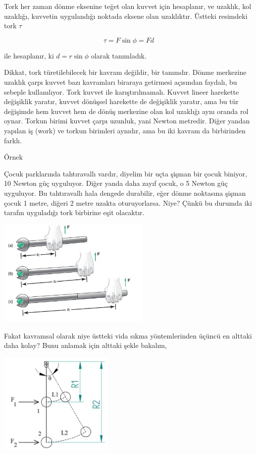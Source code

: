 \documentclass[12pt,fleqn]{article}\usepackage{../../common}
\begin{document}
Tork her zaman dönme eksenine teğet olan kuvvet için hesaplanır, ve
uzaklık, kol uzaklığı, kuvvetin uygulandığı noktada eksene olan
uzaklıktır. Üstteki resimdeki tork $\tau$

$$
\tau = F \sin \phi = F d
$$

ile hesaplanır, ki $d = r \sin\phi$ olarak tanımladık.

Dikkat, tork türetilebilecek bir kavram değildir, bir tanımdır. Dönme merkezine
uzaklık çarpı kuvvet bazı kavramları biraraya getirmesi açısından faydalı, bu
sebeple kullanılıyor. Tork kuvvet ile karıştırılmamalı. Kuvvet lineer harekette
değişiklik yaratır, kuvvet dönüşsel harekette de değişiklik yaratır, ama bu tür
değişimde hem kuvvet hem de dönüş merkezine olan kol uzaklığı aynı oranda rol
oynar. Torkun birimi kuvvet çarpı uzunluk, yani Newton metredir. Diğer yandan
yapılan iş (work) ve torkun birimleri aynıdır, ama bu iki kavram da birbirinden
farklı.


Örnek

Çocuk parklarında tahtıravallı vardır, diyelim bir uçta şişman bir çocuk
biniyor, 10 Newton güç uyguluyor. Diğer yanda daha zayıf çocuk, o 5 Newton
güç uyguluyor. Bu tahtıravallı hala dengede durabilir, eğer dönme noktasına
şişman çocuk 1 metre, diğeri 2 metre uzakta oturuyorlarsa. Niye? Çünkü bu
durumda iki tarafın uyguladığı tork birbirine eşit olacaktır.

\includegraphics[width=20em]{phy_005_basics_02_07.jpg}

Fakat kavramsal olarak niye üstteki vida sıkma yöntemlerinden üçüncü en alttaki
daha kolay? Bunu anlamak için alttaki şekle bakalım,

\includegraphics[width=15em]{phy_005_basics_02_13.jpg}
\end{document}
